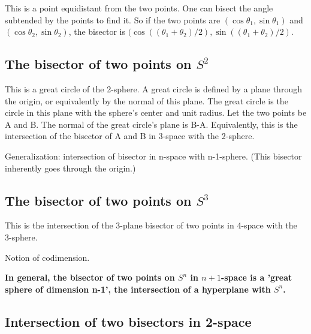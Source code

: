 \documentclass[12pt]{article}
\begin{document}
This is a point equidistant from the two points.
One can bisect the angle subtended by the points to find it.
So if the two points are $(\cos \theta_1, \sin \theta_1)$ and 
$(\cos \theta_2, \sin \theta_2)$, the bisector is
$(\cos ((\theta_1 + \theta_2)/2), \sin ((\theta_1 + \theta_2)/2)$.

\subsection{The bisector of two points on $S^2$}

This is a great circle of the 2-sphere.
A great circle is defined by a plane through the origin, 
or equivalently by the normal of this plane.
The great circle is the circle in this plane with the sphere's center and unit radius.
Let the two points be A and B.
The normal of the great circle's plane is B-A.
Equivalently, this is the intersection of the bisector of A and B in 3-space
with the 2-sphere.

Generalization: intersection of bisector in n-space with n-1-sphere.
(This bisector inherently goes through the origin.)


\subsection{The bisector of two points on $S^3$}

This is the intersection of the 3-plane bisector of two points in 4-space with
the 3-sphere.

Notion of codimension.

{\bf In general, the bisector of two points on $S^n$ in $n+1$-space 
is a 'great sphere of dimension n-1', 
the intersection of a hyperplane with $S^n$.}

\subsection{Intersection of two bisectors in 2-space}
\end{document}
